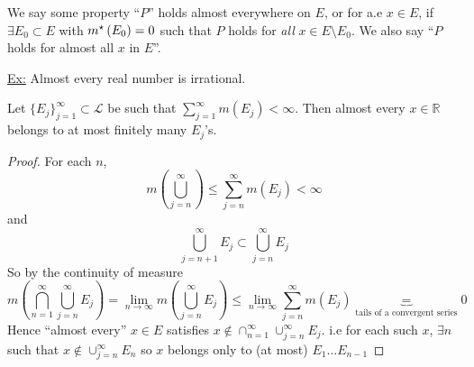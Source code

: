 \begin{definition}
    We say some property ``$P$'' holds almost everywhere on $E$, or for a.e $x \in E$, if $\exists E_0 \subset E$ with $m^{\star}\left(E_0\right) = 0$ such that $P$ holds for \emph{all} $x \in E \setminus E_0$.
    We also say ``$P$ holds for almost all $x$ in $E$''.
\end{definition}

\underline{Ex:} Almost every real number is irrational.

\begin{prop}
    Let $\{ E_j\}_{j=1}^{\infty} \subset \mathcal{L}$ be such that $\sum_{j=1}^{\infty} m(E_j) < \infty$.
    Then almost every $x \in \mathbb{R}$ belongs to at most finitely many $E_j$'s.
\end{prop}
\begin{proof}
    For each $n$,
    \[
        m\left( \bigcup_{j=n}^{\infty} \right) \leq \sum_{j=n}^{\infty} m(E_j) < \infty
    \]
    and
    \[
        \bigcup_{j=n+1}^{\infty} E_j \subset \bigcup_{j=n}^{\infty} E_j
    \]
    So by the continuity of measure
    \[
        m \left( \bigcap_{n=1}^{\infty} \bigcup_{j=n}^{\infty} E_j \right) = \lim_{n \rightarrow \infty} m \left( \bigcup_{j=n}^{\infty} E_j \right) \leq \lim_{n \rightarrow \infty} \sum_{j=n}^{\infty} m(E_j) \underbrace{=}_{\text{tails of a convergent series}} 0
    \]
    Hence ``almost every'' $x \in E$ satisfies $x \notin \cap_{n=1}^{\infty} \cup_{j=n}^{\infty} E_j$.
    i.e for each such $x$, $\exists n$ such that $x \notin \cup_{j=n}^{\infty} E_n$ so $x$ belongs only to (at most) $E_1 \hdots E_{n-1}$
\end{proof}